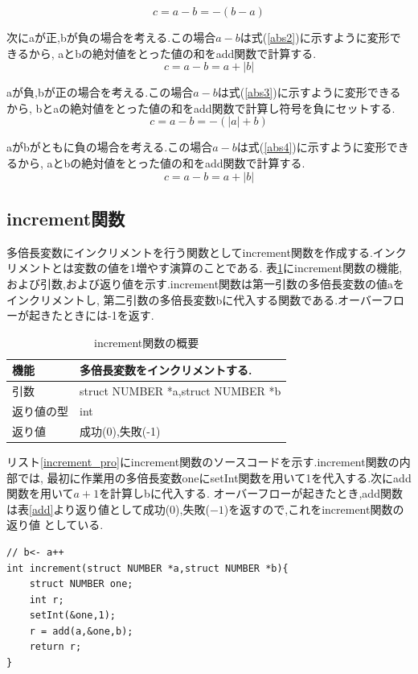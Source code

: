 \documentclass[a4j] {jarticle}
\begin{document}
  \begin{equation}
    c = a-b = -(b-a)
    \label{abs1}
    \end{equation}

    次にaが正,bが負の場合を考える.この場合$a-b$は式(\ref{abs2})に示すように変形できるから,
  aとbの絶対値をとった値の和をadd関数で計算する.
  \begin{equation}
    c = a-b = a + |b|
    \label{abs2}
    \end{equation}

    aが負,bが正の場合を考える.この場合$a-b$は式(\ref{abs3})に示すように変形できるから,
  bとaの絶対値をとった値の和をadd関数で計算し符号を負にセットする.
  \begin{equation}
    c = a-b = -(|a| + b)
    \label{abs3}
    \end{equation}

    aがbがともに負の場合を考える.この場合$a-b$は式(\ref{abs4})に示すように変形できるから,
  aとbの絶対値をとった値の和をadd関数で計算する.
  \begin{equation}
    c = a-b = a + |b|
    \label{abs4}
    \end{equation}

\subsection{increment関数}
多倍長変数にインクリメントを行う関数としてincrement関数を作成する.インクリメントとは変数の値を1増やす演算のことである.
表\ref{increment}にincrement関数の機能,および引数,および返り値を示す.increment関数は第一引数の多倍長変数の値aをインクリメントし,
第二引数の多倍長変数bに代入する関数である.オーバーフローが起きたときには-1を返す.
\begin{table}[H]
  \caption{increment関数の概要}
  \label{increment}
  \begin{center}
      \begin{tabular}{|l|l|}\hline
      機能 & 多倍長変数をインクリメントする.\\ \hline
      引数 & struct NUMBER *a,struct NUMBER *b\\ \hline
      返り値の型 & int\\ \hline
      返り値 & 成功(0),失敗(-1)\\ \hline
      \end{tabular}
  \end{center}
  \end{table}

  リスト\ref{increment_pro}にincrement関数のソースコードを示す.increment関数の内部では,
  最初に作業用の多倍長変数oneにsetInt関数を用いて1を代入する.次にadd関数を用いて$a+1$を計算しbに代入する.
  オーバーフローが起きたとき,add関数は表\ref{add}より返り値として成功(0),失敗($-1$)を返すので,これをincrement関数の返り値
  としている.
  \begin{lstlisting}[basicstyle=\ttfamily\footnotesize, frame=single,label=increment_pro,caption=increment関数のソースコード]
// b<- a++
int increment(struct NUMBER *a,struct NUMBER *b){
    struct NUMBER one;
    int r;
    setInt(&one,1);
    r = add(a,&one,b);
    return r;
}
\end{lstlisting}
\end{document}
